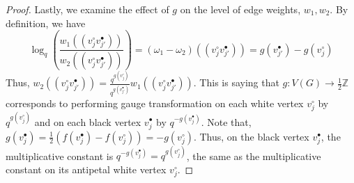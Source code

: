 \documentclass[10pt,a4paper]{amsart}
\begin{document}
\begin{proof}
    Lastly, we examine the effect of $g$ on the level of edge weights, $w_1,w_2$. By definition, we have $$\log_q(\frac{w_1((v^\circ_jv^\bullet_{j'}))}{w_2((v^\circ_jv^\bullet_{j'}))}) = (\omega_1-\omega_2)((v^\circ_jv^\bullet_{j'})) = g(v^\bullet_{j'})-g(v^\circ_j)$$ Thus, $w_2((v^\circ_jv^\bullet_{j'})) = \displaystyle\frac{q^{g(v^\circ_j)}}{q^{g(v^\bullet_{j'})}}w_1((v^\circ_jv^\bullet_{j'}))$. This is saying that $g: V(G)\rightarrow \frac{1}{2}\mathbb{Z}$ corresponds to performing gauge transformation on each white vertex $v^\circ_j$ by $q^{g(v^\circ_j)}$ and on each black vertex $v^\bullet_j$ by $q^{-g(v^\bullet_j)}$. Note that, $g(v^\bullet_j) = \frac{1}{2}(f(v^\bullet_j)-f(v^\circ_j)) = -g(v^\circ_j)$. Thus, on the black vertex $v^\bullet_j$, the multiplicative constant is $q^{-g(v^\bullet_j)} = q^{g(v^\circ_j)}$, the same as the multiplicative constant on its antipetal white vertex $v^\circ_j$.
\end{proof}
\end{document}
